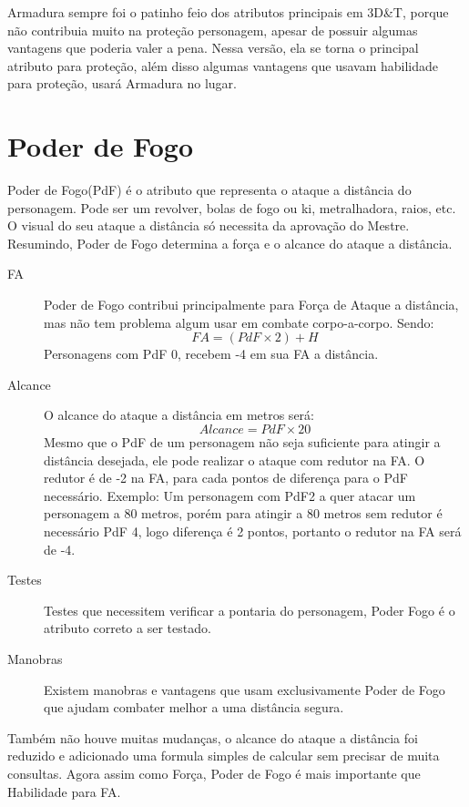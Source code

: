 \begin{framed}
Armadura sempre foi o patinho feio dos atributos principais em 3D\&T, porque não contribuia muito na proteção personagem, apesar de possuir algumas vantagens que poderia valer a pena. Nessa versão, ela se torna o principal atributo para proteção, além disso algumas vantagens que usavam habilidade para proteção, usará Armadura no lugar.
\end{framed}

\section{Poder de Fogo}

Poder de Fogo(PdF) é o atributo que representa o ataque a distância do personagem. Pode ser um revolver, bolas de fogo ou ki, metralhadora, raios, etc. O visual do seu ataque a distância só necessita da aprovação do Mestre. Resumindo, Poder de Fogo determina a força e o alcance do ataque a distância. 

\begin{description}
\item[FA] Poder de Fogo contribui principalmente para Força de Ataque a distância, mas não tem problema algum usar em combate corpo-a-corpo. Sendo:
\[ FA = (PdF \times 2) + H \]
Personagens com PdF 0, recebem -4 em sua FA a distância.
\item[Alcance]
O alcance do ataque a distância em metros será:
\[ Alcance = PdF \times 20 \]
Mesmo que o PdF de um personagem não seja suficiente para atingir a distância desejada, ele pode realizar o ataque com redutor na FA. O redutor é de -2 na FA, para cada pontos de diferença para o PdF necessário. Exemplo: Um personagem com PdF2 a quer atacar um personagem a 80 metros, porém para atingir a 80 metros sem redutor é necessário PdF 4, logo diferença é 2 pontos, portanto o redutor na FA será de -4.
\item[Testes]
Testes que necessitem verificar a pontaria do personagem, Poder Fogo é o atributo correto a ser testado.
\item[Manobras]
Existem manobras e vantagens que usam exclusivamente Poder de Fogo que ajudam combater melhor a uma distância segura.
\end{description}

\begin{framed}
Também não houve muitas mudanças, o alcance do ataque a distância foi reduzido e adicionado uma formula simples de calcular sem precisar de muita consultas. Agora assim como Força, Poder de Fogo é mais importante que Habilidade para FA.
\end{framed}

